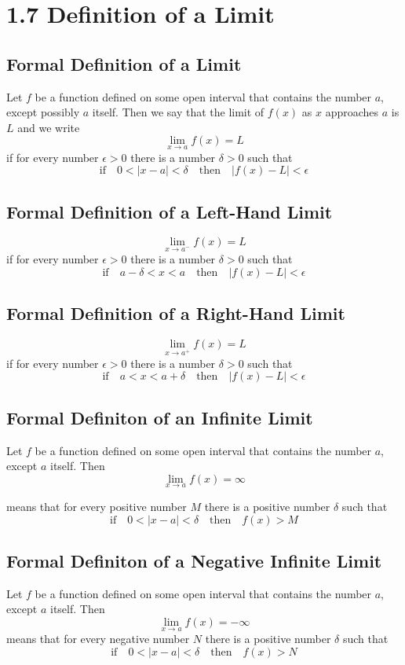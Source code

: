 %
%

\section*{1.7 Definition of a Limit}

\subsection*{Formal Definition of a Limit}

Let \(f\) be a function defined on some open interval that contains the number \(a\), except possibly \(a\) itself. Then we say that the limit of \(f(x)\) as \(x\) approaches \(a\) is \(L\) and we write
$$\lim_{x \to a}f(x)=L$$
if for every number \(\epsilon > 0\) there is a number \(\delta > 0\) such that
$$\text{if} \quad 0< \left| x-a \right| <\delta \quad \text{then} \quad \left| f(x)-L \right| <\epsilon$$

\subsection*{Formal Definition of a Left-Hand Limit}

$$\lim_{x \to a^-}f(x)=L$$
if for every number \(\epsilon > 0\) there is a number \(\delta > 0\) such that 
$$\text{if} \quad a-\delta<x<a \quad \text{then} \quad \left| f(x)-L \right| <\epsilon$$ 

\subsection*{Formal Definition of a Right-Hand Limit}

$$\lim_{x \to a^+}f(x)=L$$
if for every number \(\epsilon > 0\) there is a number \(\delta > 0\) such that 
$$\text{if} \quad a<x<a+\delta \quad \text{then} \quad \left| f(x)-L \right| <\epsilon$$ 

\subsection*{Formal Definiton of an Infinite Limit}

Let \(f\) be a function defined on some open interval that contains the number \(a\), except \(a\) itself. Then
$$\lim_{x \to a}f(x)=\infty$$

means that for every positive number \(M\) there is a positive number \(\delta\) such that 
$$\text{if} \quad 0< \left| x-a \right| <\delta \quad \text{then} \quad f(x)>M$$


\subsection*{Formal Definiton of a Negative Infinite Limit}

Let \(f\) be a function defined on some open interval that contains the number \(a\), except \(a\) itself. Then
$$\lim_{x \to a}f(x)=-\infty$$
means that for every negative number \(N\) there is a positive number \(\delta\) such that 
$$\text{if} \quad 0< \left| x-a \right| <\delta \quad \text{then} \quad f(x)>N$$

